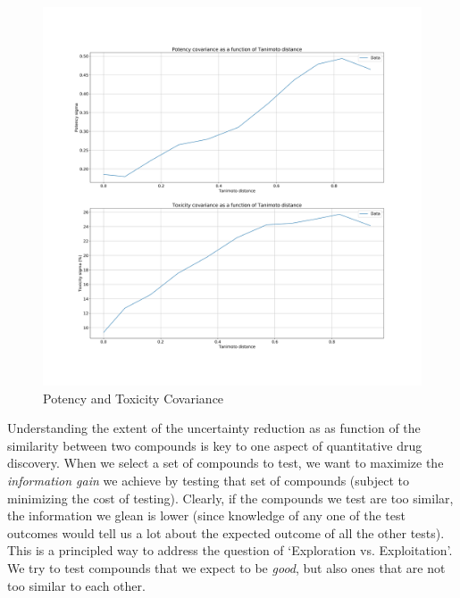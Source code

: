 \documentclass{article}
\begin{document}
\begin{figure}[h!]
\centering
\includegraphics[width=\textwidth]{fig3_covariance.jpg}
\caption{Potency and Toxicity Covariance}
\label{fig:cov}
\end{figure}
\newline
Understanding the extent of the uncertainty reduction as as function of the similarity between two compounds is key to one aspect of quantitative drug discovery.  When we select a set of compounds to test, we want to maximize the \textit{information gain} we achieve by testing that set of compounds (subject to minimizing the cost of testing).  Clearly, if the compounds we test are too similar, the information we glean is lower (since knowledge of any one of the test outcomes would tell us a lot about the expected outcome of all the other tests).  This is a principled way to address the question of `Exploration vs. Exploitation'.  We try to test compounds that we expect to be \textit{good}, but also ones that are not too similar to each other.
\end{document}
